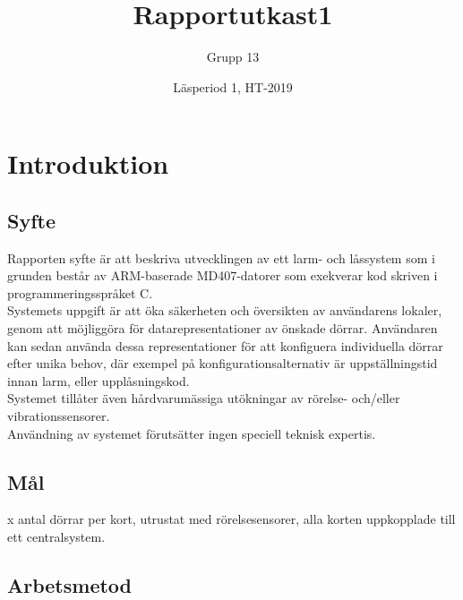 \documentclass{article}
\title{Rapportutkast1}
\author{Grupp 13}
\date{Läsperiod 1, HT-2019}
\begin{document}
\maketitle
{}
\newpage

\tableofcontents
\newpage



\section{Introduktion}
\subsection{Syfte} %
Rapporten syfte är att beskriva utvecklingen av ett larm- och låssystem som i grunden består av ARM-baserade MD407-datorer som exekverar kod skriven i programmeringsspråket C. \\
Systemets uppgift är att öka säkerheten och översikten av användarens lokaler, genom att möjliggöra för datarepresentationer av önskade dörrar. Användaren kan sedan använda dessa representationer för att konfiguera individuella dörrar efter unika behov, där exempel på konfigurationsalternativ är uppställningstid innan larm, eller upplåsningskod. \\
Systemet tillåter även hårdvarumässiga utökningar av rörelse- och/eller vibrationssensorer.
\\
Användning av systemet förutsätter ingen speciell teknisk expertis.


\subsection{Mål} %
x antal dörrar per kort, utrustat med rörelsesensorer, alla korten uppkopplade till ett centralsystem.

\subsection{Arbetsmetod} %
\end{document}
